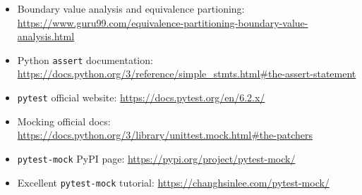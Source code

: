 \documentclass[11pt]{article}
\begin{document}
\begin{itemize}
    \item Boundary value analysis and equivalence partioning: \url{https://www.guru99.com/equivalence-partitioning-boundary-value-analysis.html}
    \item Python \texttt{assert} documentation: \url{https://docs.python.org/3/reference/simple_stmts.html#the-assert-statement}
    \item \texttt{pytest} official website: \url{https://docs.pytest.org/en/6.2.x/}
    \item Mocking official docs: \url{https://docs.python.org/3/library/unittest.mock.html#the-patchers}
    \item \texttt{pytest-mock} PyPI page: \url{https://pypi.org/project/pytest-mock/}
    \item Excellent \texttt{pytest-mock} tutorial: \url{https://changhsinlee.com/pytest-mock/}
\end{itemize}

%
\end{document}
